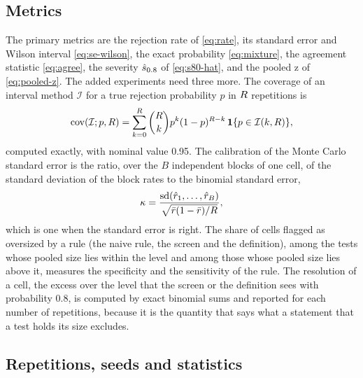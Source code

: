 \subsection{Metrics}
\label{sec:ed-metrics}

The primary metrics are the rejection rate of \eqref{eq:rate}, its standard error and Wilson interval \eqref{eq:se-wilson}, the exact probability \eqref{eq:mixture}, the agreement statistic \eqref{eq:agree}, the severity $\hat{s}_{0.8}$ of \eqref{eq:s80-hat}, and the pooled z of \eqref{eq:pooled-z}.
The added experiments need three more.
The coverage of an interval method $\mathcal I$ for a true rejection probability $p$ in $R$ repetitions is
\begin{equation}
\mathrm{cov}(\mathcal I;p,R)=\sum_{k=0}^{R}\binom{R}{k}p^k(1-p)^{R-k}\,\mathbf{1}\{p\in\mathcal I(k,R)\},
\label{eq:coverage}
\end{equation}
computed exactly, with nominal value 0.95.
The calibration of the Monte Carlo standard error is the ratio, over the $B$ independent blocks of one cell, of the standard deviation of the block rates to the binomial standard error,
\begin{equation}
\kappa=\frac{\mathrm{sd}(\hat{r}_1,\dots,\hat{r}_B)}{\sqrt{\bar{r}(1-\bar{r})/R}},
\label{eq:kappa}
\end{equation}
which is one when the standard error is right.
The share of cells flagged as oversized by a rule (the naive rule, the screen and the definition), among the tests whose pooled size lies within the level and among those whose pooled size lies above it, measures the specificity and the sensitivity of the rule. The resolution of a cell, the excess over the level that the screen or the definition sees with probability 0.8, is computed by exact binomial sums and reported for each number of repetitions, because it is the quantity that says what a statement that a test holds its size excludes.

\subsection{Repetitions, seeds and statistics}
\label{sec:ed-statistics}

